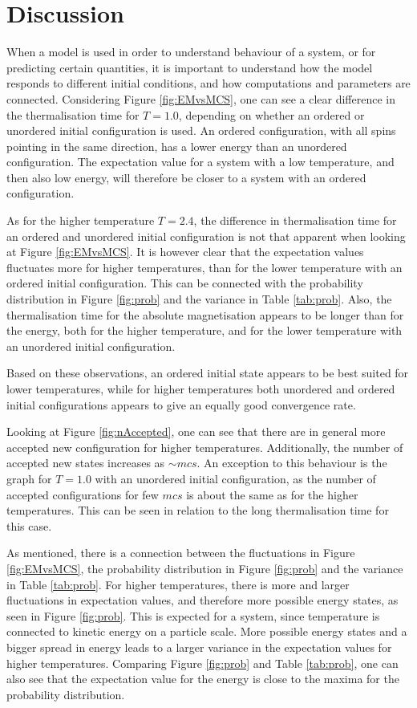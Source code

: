 \section{Discussion}
\label{sec:discussion}
When a model is used in order to understand behaviour of a system, or for predicting certain quantities, it is important to understand how the model responds to different initial conditions, and how computations and parameters are connected. 
Considering Figure \ref{fig:EMvsMCS}, one can see a clear difference in the thermalisation time for $T=1.0$, depending on whether an ordered or unordered initial configuration is used. An ordered configuration, with all spins pointing in the same direction, has a lower energy than an unordered configuration. The expectation value for a system with a low temperature, and then also low energy, will therefore be closer to a system with an ordered configuration. 

As for the higher temperature $T=2.4$, the difference in thermalisation time for an ordered and unordered initial configuration is not that apparent when looking at Figure \ref{fig:EMvsMCS}. It is however clear that the expectation values fluctuates more for higher temperatures, than for the lower temperature with an ordered initial configuration. This can be connected with the probability distribution in Figure \ref{fig:prob} and the variance in Table \ref{tab:prob}. Also, the thermalisation time for the absolute magnetisation appears to be longer than for the energy, both for the higher temperature, and for the lower temperature with an unordered initial configuration. 

Based on these observations, an ordered initial state appears to be best suited for lower temperatures, while for higher temperatures both unordered and ordered initial configurations appears to give an equally good convergence rate.  

Looking at Figure \ref{fig:nAccepted}, one can see that there are in general more accepted new configuration for higher temperatures. Additionally, the number of accepted new states increases as $\sim mcs$. An exception to this behaviour is the graph for $T=1.0$ with an unordered initial configuration, as the number of accepted configurations for few $mcs$ is about the same as for the higher temperatures. This can be seen in relation to the long thermalisation time for this case. 

As mentioned, there is a connection between the fluctuations in Figure \ref{fig:EMvsMCS}, the probability distribution in Figure \ref{fig:prob} and the variance in Table \ref{tab:prob}. For higher temperatures, there is more and larger fluctuations in expectation values, and therefore more possible energy states, as seen in Figure \ref{fig:prob}. This is expected for a system, since temperature is connected to kinetic energy on a particle scale. More possible energy states and a bigger spread in energy leads to a larger variance in the expectation values for higher temperatures. Comparing Figure \ref{fig:prob} and Table \ref{tab:prob}, one can also see that the expectation value for the energy is close to the maxima for the probability distribution. 


